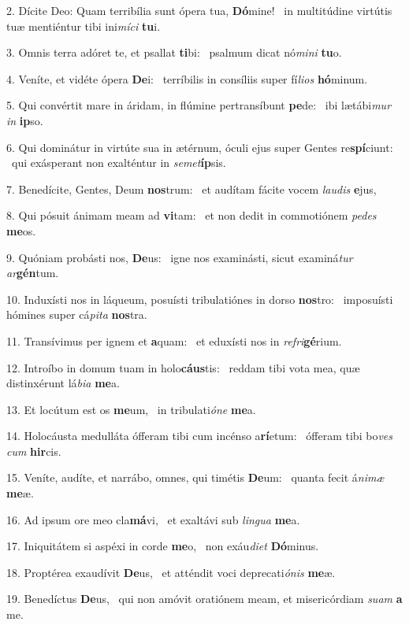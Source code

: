 2. Dícite Deo: Quam terribília sunt ópera tua, \textbf{Dó}mine! \ast\  in multitúdine virtútis tuæ mentiéntur tibi ini\textit{mí}\textit{ci} \textbf{tu}i.\

3. Omnis terra adóret te, et psallat \textbf{ti}bi: \ast\  psalmum dicat nó\textit{mi}\textit{ni} \textbf{tu}o.\

4. Veníte, et vidéte ópera \textbf{De}i: \ast\  terríbilis in consíliis super fí\textit{li}\textit{os} \textbf{hó}minum.\

5. Qui convértit mare in áridam, in flúmine pertransíbunt \textbf{pe}de: \ast\  ibi lætábi\textit{mur} \textit{in} \textbf{ip}so.\

6. Qui dominátur in virtúte sua in ætérnum, óculi ejus super Gentes re\textbf{spí}ciunt: \ast\  qui exásperant non exalténtur in \textit{se}\textit{met}\textbf{íp}sis.\

7. Benedícite, Gentes, Deum \textbf{nos}trum: \ast\  et audítam fácite vocem \textit{lau}\textit{dis} \textbf{e}jus,\

8. Qui pósuit ánimam meam ad \textbf{vi}tam: \ast\  et non dedit in commotiónem \textit{pe}\textit{des} \textbf{me}os.\

9. Quóniam probásti nos, \textbf{De}us: \ast\  igne nos examinásti, sicut examiná\textit{tur} \textit{ar}\textbf{gén}tum.\

10. Induxísti nos in láqueum, posuísti tribulatiónes in dorso \textbf{nos}tro: \ast\  imposuísti hómines super cá\textit{pi}\textit{ta} \textbf{nos}tra.\

11. Transívimus per ignem et \textbf{a}quam: \ast\  et eduxísti nos in \textit{re}\textit{fri}\textbf{gé}rium.\

12. Introíbo in domum tuam in holo\textbf{cáus}tis: \ast\  reddam tibi vota mea, quæ distinxérunt lá\textit{bi}\textit{a} \textbf{me}a.\

13. Et locútum est os \textbf{me}um, \ast\  in tribulati\textit{ó}\textit{ne} \textbf{me}a.\

14. Holocáusta medulláta ófferam tibi cum incénso a\textbf{rí}etum: \ast\  ófferam tibi bo\textit{ves} \textit{cum} \textbf{hir}cis.\

15. Veníte, audíte, et narrábo, omnes, qui timétis \textbf{De}um: \ast\  quanta fecit á\textit{ni}\textit{mæ} \textbf{me}æ.\

16. Ad ipsum ore meo cla\textbf{má}vi, \ast\  et exaltávi sub \textit{lin}\textit{gua} \textbf{me}a.\

17. Iniquitátem si aspéxi in corde \textbf{me}o, \ast\  non exáu\textit{di}\textit{et} \textbf{Dó}minus.\

18. Proptérea exaudívit \textbf{De}us, \ast\  et atténdit voci deprecati\textit{ó}\textit{nis} \textbf{me}æ.\

19. Benedíctus \textbf{De}us, \ast\  qui non amóvit oratiónem meam, et misericórdiam \textit{su}\textit{am} \textbf{a} me.\

